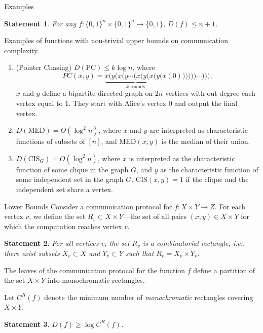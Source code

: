 \documentclass[
aspectratio=169]{beamer}
\newcommand{\pitem}{\pause\item}
\newtheorem{statement}{Statement}
\newcommand{\bits}{\{0,1\}}
\begin{document}
\begin{frame}{Examples}
    \begin{statement}
        For any $f: \{0,1\}^n \times\{0,1\}^n \to \bits$, $D(f) \le n + 1$.
    \end{statement}

    \pause
    Examples of functions with non-trivial upper bounds on communication complexity.
    \begin{enumerate}
        \item (Pointer Chasing) $D(\mathrm{PC}) \le k \log n$,
        where \[PC(x,y) = \underbrace{x(y(x(y\dotsb(x(y(x(y(x}_{\text{$k$ rounds}}(0))))))\dotsb))),\]
        $x$ and $y$ define a bipartite directed graph on $2n$ vertices with out-degree each vertex equal to $1$.
        They start with Alice's vertex $0$ and output the final vertex.


        \pitem $D(\mathrm{MED}) = O(\log^2 n)$, where $x$ and $y$ are interpreted as characteristic functions of subsets of $[n]$, and $\mathrm{MED}(x,y)$ is the median of their union.

        \pitem $D(\mathrm{CIS}_G) = O(\log^2 n)$, where $x$ is interpreted as the characteristic function of some clique in the graph $G$, and $y$ as the characteristic function of some independent set in the graph $G$. $\mathrm{CIS}(x,y) = 1$ if the clique and the independent set share a vertex.
    \end{enumerate}

\end{frame}

\begin{frame}{Lower Bounds}
    Consider a communication protocol for $f: X \times Y \to Z$. For each vertex $v$, we define the set $R_v \subset X \times Y$—the set of all pairs $(x,y) \in X \times Y$ for which the computation reaches vertex $v$.

    \pause
    \begin{statement}
        For all vertices $v$, the set $R_v$ is a combinatorial rectangle, i.e., there exist subsets $X_v \subset X$ and $Y_v \subset Y$ such that $R_v = X_v \times Y_v$.
    \end{statement}

    \pause
    \begin{corollary}
        The leaves of the communication protocol for the function $f$ define a partition of the set $X \times Y$ into monochromatic rectangles.
    \end{corollary}

    Let $C^R(f)$ denote the minimum number of \emph{monochromatic} rectangles covering $X \times Y$.

    \pause
    \begin{statement}
        $D(f) \ge \log C^R(f)$.
    \end{statement}

\end{frame}
\end{document}
